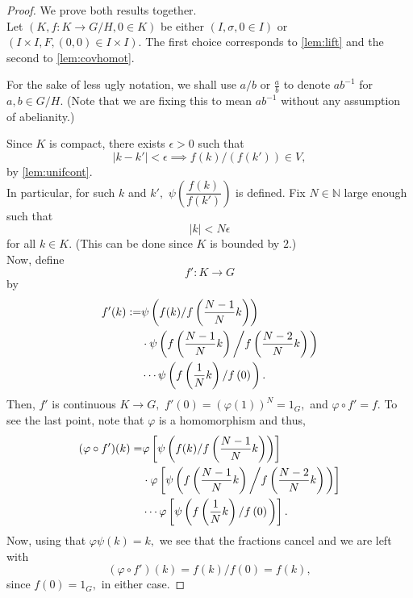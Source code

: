 \documentclass[12pt]{article}
\begin{document}
\begin{proof} 
 	We prove both results together.\\
 	Let $(K, f:K\to G/H, 0 \in K)$ be either $(I, \sigma, 0 \in I)$ or $(I \times I, F, (0, 0) \in I \times I).$ The first choice corresponds to \cref{lem:lift} and the second to \cref{lem:covhomot}. 

 	For the sake of less ugly notation, we shall use $a/b$ or $\frac{a}{b}$ to denote $ab^{-1}$ for $a, b \in G/H.$ (Note that we are fixing this to mean $ab^{-1}$ without any assumption of abelianity.)

 	Since $K$ is compact, there exists $\epsilon > 0$ such that 
 	\begin{equation*} 
 		|k - k'| < \epsilon \implies f(k)/(f(k')) \in V,
 	\end{equation*} by \cref{lem:unifcont}.\\
 	In particular, for such $k$ and $k',$ $\psi\left(\dfrac{f(k)}{f(k')}\right)$ is defined. Fix $N \in \mathbb{N}$ large enough such that
 	\begin{equation*} 
 		|k| < N\epsilon
 	\end{equation*}
 	for all $k \in K.$ (This can be done since $K$ is bounded by $2$.)\\
 	Now, define
 	\begin{equation*} 
 		f':K \to G
 	\end{equation*}
 	by
 	\begin{align*} 
 		f'(k) \vcentcolon= &\psi\left(f(k)/f\left(\dfrac{N-1}{N}k\right)\right)\\
 		& \cdot \psi\left(f\left(\dfrac{N-1}{N}k\right)\left/f\left(\dfrac{N-2}{N}k\right)\right.\right)\\
 		& \cdots \psi\left(f\left(\dfrac{1}{N}k\right)\left/f\left(0\right)\right.\right).
 	\end{align*}
 	Then, $f'$ is continuous $K \to G,$ $f'(0) = (\varphi(1))^N = 1_G,$ and $\varphi\circ f' = f.$ To see the last point, note that $\varphi$ is a homomorphism and thus,
 	\begin{align*} 
 		(\varphi\circ f')(k) = &\varphi\left[\psi\left(f(k)/f\left(\dfrac{N-1}{N}k\right)\right)\right]\\
 		& \cdot \varphi\left[\psi\left(f\left(\dfrac{N-1}{N}k\right)\left/f\left(\dfrac{N-2}{N}k\right)\right.\right)\right]\\
 		& \cdots \varphi\left[\psi\left(f\left(\dfrac{1}{N}k\right)\left/f\left(0\right)\right.\right)\right].
 	\end{align*}
 	Now, using that $\varphi\psi(k) = k,$ we see that the fractions cancel and we are left with
 	\begin{equation*} 
 		(\varphi\circ f')(k) = f(k)/f(0) = f(k),
 	\end{equation*}
 	since $f(0) = 1_G,$ in either case.


\end{proof}
\end{document}
